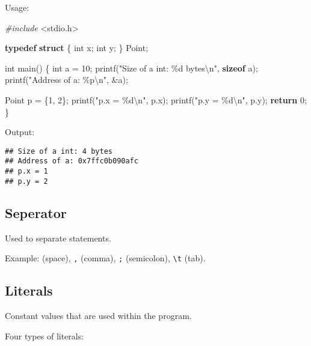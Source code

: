 \documentclass[
]{article}
\newenvironment{Shaded}{\begin{snugshade}}{\end{snugshade}}
\newcommand{\ControlFlowTok}[1]{\textcolor[rgb]{0.13,0.29,0.53}{\textbf{#1}}}
\newcommand{\DataTypeTok}[1]{\textcolor[rgb]{0.13,0.29,0.53}{#1}}
\newcommand{\DecValTok}[1]{\textcolor[rgb]{0.00,0.00,0.81}{#1}}
\newcommand{\ImportTok}[1]{#1}
\newcommand{\KeywordTok}[1]{\textcolor[rgb]{0.13,0.29,0.53}{\textbf{#1}}}
\newcommand{\NormalTok}[1]{#1}
\newcommand{\PreprocessorTok}[1]{\textcolor[rgb]{0.56,0.35,0.01}{\textit{#1}}}
\newcommand{\SpecialCharTok}[1]{\textcolor[rgb]{0.00,0.00,0.00}{#1}}
\newcommand{\StringTok}[1]{\textcolor[rgb]{0.31,0.60,0.02}{#1}}
\begin{document}
Usage:

\begin{Shaded}
\begin{Highlighting}[]
\PreprocessorTok{\#include }\ImportTok{\textless{}stdio.h\textgreater{}}

\KeywordTok{typedef} \KeywordTok{struct}\NormalTok{ \{}
    \DataTypeTok{int}\NormalTok{ x;}
    \DataTypeTok{int}\NormalTok{ y;}
\NormalTok{\} Point;}

\DataTypeTok{int}\NormalTok{ main() \{}
    \DataTypeTok{int}\NormalTok{ a = }\DecValTok{10}\NormalTok{;}
\NormalTok{    printf(}\StringTok{"Size of a int: \%d bytes}\SpecialCharTok{\textbackslash{}n}\StringTok{"}\NormalTok{, }\KeywordTok{sizeof}\NormalTok{ a);}
\NormalTok{    printf(}\StringTok{"Address of a: \%p}\SpecialCharTok{\textbackslash{}n}\StringTok{"}\NormalTok{, \&a);}

\NormalTok{    Point p = \{}\DecValTok{1}\NormalTok{, }\DecValTok{2}\NormalTok{\};}
\NormalTok{    printf(}\StringTok{"p.x = \%d}\SpecialCharTok{\textbackslash{}n}\StringTok{"}\NormalTok{, p.x);}
\NormalTok{    printf(}\StringTok{"p.y = \%d}\SpecialCharTok{\textbackslash{}n}\StringTok{"}\NormalTok{, p.y);}
    \ControlFlowTok{return} \DecValTok{0}\NormalTok{;}
\NormalTok{\}}
\end{Highlighting}
\end{Shaded}

Output:

\begin{verbatim}
## Size of a int: 4 bytes
## Address of a: 0x7ffc0b090afc
## p.x = 1
## p.y = 2
\end{verbatim}

\hypertarget{seperator}{%
\subsection{Seperator}\label{seperator}}

Used to separate statements.

Example: \texttt{} (space), \texttt{,} (comma), \texttt{;} (semicolon),
\texttt{\textbackslash{}t} (tab).

\hypertarget{literals}{%
\subsection{Literals}\label{literals}}

Constant values that are used within the program.

Four types of literals:
\end{document}
